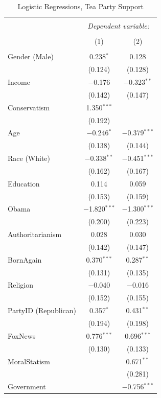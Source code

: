 \documentclass[12pt,]{article}
\begin{document}
\begin{table}[!htbp] \centering 
  \caption{Logistic Regressions, Tea Party Support} 
  \label{} 
\footnotesize 
\begin{tabular}{@{\extracolsep{5pt}}lcc} 
\\[-1.8ex]\hline 
\hline \\[-1.8ex] 
 & \multicolumn{2}{c}{\textit{Dependent variable:}} \\ 
\cline{2-3} 
\\[-1.8ex] & (1) & (2)\\ 
\hline \\[-1.8ex] 
 Gender (Male) & 0.238$^{*}$ & 0.128 \\ 
  & (0.124) & (0.128) \\ 
  Income & $-$0.176 & $-$0.323$^{**}$ \\ 
  & (0.142) & (0.147) \\ 
  Conservatism & 1.350$^{***}$ &  \\ 
  & (0.192) &  \\ 
  Age & $-$0.246$^{*}$ & $-$0.379$^{***}$ \\ 
  & (0.138) & (0.144) \\ 
  Race (White) & $-$0.338$^{**}$ & $-$0.451$^{***}$ \\ 
  & (0.162) & (0.167) \\ 
  Education & 0.114 & 0.059 \\ 
  & (0.153) & (0.159) \\ 
  Obama & $-$1.820$^{***}$ & $-$1.300$^{***}$ \\ 
  & (0.200) & (0.223) \\ 
  Authoritarianism & 0.028 & 0.030 \\ 
  & (0.142) & (0.147) \\ 
  BornAgain & 0.370$^{***}$ & 0.287$^{**}$ \\ 
  & (0.131) & (0.135) \\ 
  Religion & $-$0.040 & $-$0.016 \\ 
  & (0.152) & (0.155) \\ 
  PartyID (Republican) & 0.357$^{*}$ & 0.431$^{**}$ \\ 
  & (0.194) & (0.198) \\ 
  FoxNews & 0.776$^{***}$ & 0.696$^{***}$ \\ 
  & (0.130) & (0.133) \\ 
  MoralStatism &  & 0.671$^{**}$ \\ 
  &  & (0.281) \\ 
  Government &  & $-$0.756$^{***}$ \\ 

\end{tabular}
\end{table}
\end{document}
